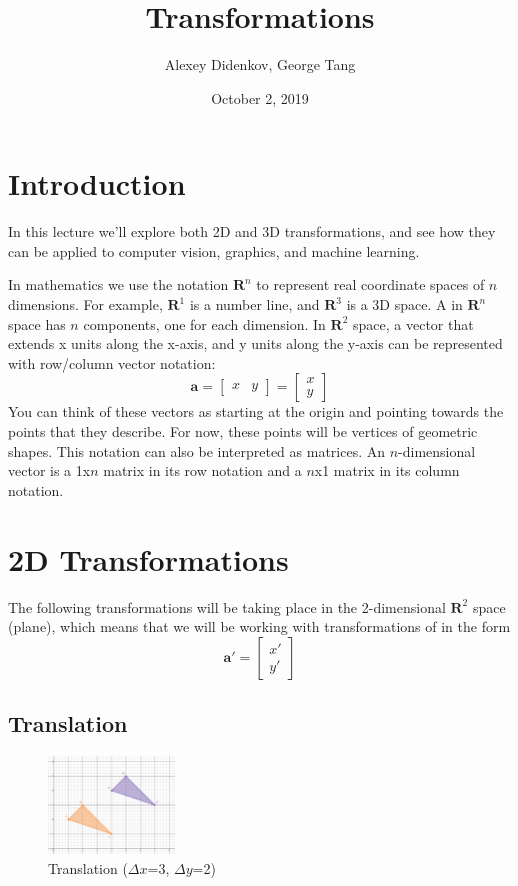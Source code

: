 \documentclass{article}
\title{Transformations}
\author{Alexey Didenkov, George Tang}
\date{October 2, 2019}
\begin{document}
\maketitle

\section{Introduction}
In this lecture we'll explore both 2D and 3D transformations, and see how they can be applied to computer vision, graphics, and machine learning. 

In mathematics we use the notation $\mathbf R^n$ to represent real coordinate spaces of $n$ dimensions. For example, $\mathbf R^1$ is a number line, and $\mathbf R^3$ is a 3D space. A  in $\mathbf R^n$ space has $n$ components, one for each dimension. In $\mathbf R^2$ space, a vector that extends x units along the x-axis, and y units along the y-axis can be represented with row/column vector notation:
\[\mathbf{a} = \begin{bmatrix}x & y\end{bmatrix} = \begin{bmatrix}x \\y\end{bmatrix}\]
\noindent
You can think of these vectors as starting at the origin and pointing towards the points that they describe. For now, these points will be vertices of geometric shapes. This notation can also be interpreted as matrices. An $n$-dimensional vector is a 1x$n$ matrix in its row notation and a $n$x1 matrix in its column notation.

\section{2D Transformations}
The following transformations will be taking place in the 2-dimensional $\mathbf R^2$ space (plane), which means that we will be working with transformations of  in the form
\[\mathbf{a}' = \begin{bmatrix}x' \\y'\end{bmatrix}\]

\subsection{Translation}
\begin{figure}
  \begin{center}
    \vspace{-75pt}
    \includegraphics[width=0.30\textwidth]{2d_translation.png}
    \vspace{-17.5pt}
  \end{center}
  \caption{Translation ($\Delta x$=3, $\Delta y$=2)}
\end{figure}
\end{document}
